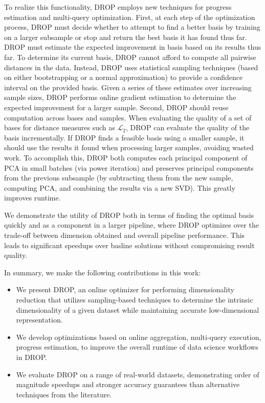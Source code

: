 To realize this functionality, DROP employs new techniques for progress estimation and multi-query optimization.
First, at each step of the optimization process, DROP must decide whether to attempt to find a better basis by training on a larger subsample or stop and return the best basis it has found thus far.
DROP must estimate the expected improvement in basis based on its results thus far.
To determine its current basis, DROP cannot afford to compute all pairwise distances in the data.
Instead, DROP uses statistical sampling techniques (based on either bootstrapping or a normal approximation) to provide a confidence interval on the provided basis.
Given a series of these estimates over increasing sample sizes, DROP performs online gradient estimation to determine the expected improvement for a larger sample.
Second, DROP should reuse computation across bases and samples.
When evaluating the quality of a set of bases for distance measures such as $\mathcal{L}_2$, DROP can evaluate the quality of the basis incrementally.
If DROP finds a feasible basis using a smaller sample, it should use the results it found when processing larger samples, avoiding wasted work.
To accomplish this, DROP both computes each principal component of PCA in small batches (via power iteration) and preserves principal components from the previous subsample (by subtracting them from the new sample, computing PCA, and combining the results via a new SVD).
This greatly improves runtime.

We demonstrate the utility of DROP both in terms of finding the optimal basis quickly and as a component in a larger pipeline, where DROP optimizes over the trade-off between dimension obtained and overall pipeline performance. This leads to significant speedups over basline solutions without compromising result quality.

In summary, we make the following contributions in this work:

\begin{itemize}
\item We present DROP, an online optimizer for performing dimensionality reduction that utilizes sampling-based techniques to determine the intrinsic dimensionality of a given dataset while maintaining accurate low-dimensional representation.

\item  We develop optimizations based on online aggregation, multi-query execution, progress estimation, to improve the overall runtime of data science workflows in DROP.

\item We evaluate DROP on a range of real-world datasets, demonstrating order of magnitude speedups and stronger accuracy guarantees than alternative techniques from the literature.
\end{itemize}

